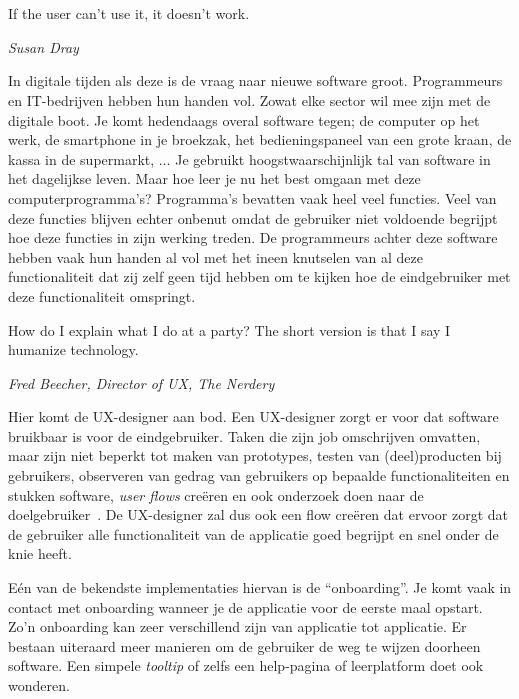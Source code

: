 
\chapter{}
\label{ch:inleiding}

\epigraph{If the user can't use it, it doesn't work.}{\textit{Susan Dray}}

In digitale tijden als deze is de vraag naar nieuwe software groot. Programmeurs en IT-bedrijven hebben hun handen vol. Zowat elke sector wil mee zijn met de digitale boot. Je komt hedendaags overal software tegen; de computer op het werk, de smartphone in je broekzak, het bedieningspaneel van een grote kraan, de kassa in de supermarkt, $\dots$ Je gebruikt hoogstwaarschijnlijk tal van software in het dagelijkse leven. Maar hoe leer je nu het best omgaan met deze computerprogramma's? Programma's bevatten vaak heel veel functies. Veel van deze functies blijven echter onbenut omdat de gebruiker niet voldoende begrijpt hoe deze functies in zijn werking treden. De programmeurs achter deze software hebben vaak hun handen al vol met het ineen knutselen van al deze functionaliteit dat zij zelf geen tijd hebben om te kijken hoe de eindgebruiker met deze functionaliteit omspringt.

\epigraph{How do I explain what I do at a party? The short version is that I say I humanize technology.}{\textit{Fred Beecher, Director of UX, The Nerdery}}

Hier komt de UX-designer aan bod. Een UX-designer zorgt er voor dat software bruikbaar is voor de eindgebruiker. Taken die zijn job omschrijven omvatten, maar zijn niet beperkt tot maken van prototypes, testen van (deel)producten bij gebruikers, observeren van gedrag van gebruikers op bepaalde functionaliteiten en stukken software, \textit{user flows} creëren en ook onderzoek doen naar de doelgebruiker~\autocite{White2020}. De UX-designer zal dus ook een flow creëren dat ervoor zorgt dat de gebruiker alle functionaliteit van de applicatie goed begrijpt en snel onder de knie heeft.

Eén van de bekendste implementaties hiervan is de ``onboarding''. Je komt vaak in contact met onboarding wanneer je de applicatie voor de eerste maal opstart. Zo'n onboarding kan zeer verschillend zijn van applicatie tot applicatie.
Er bestaan uiteraard meer manieren om de gebruiker de weg te wijzen doorheen software. Een simpele \textit{tooltip} of zelfs een help-pagina of leerplatform doet ook wonderen.

